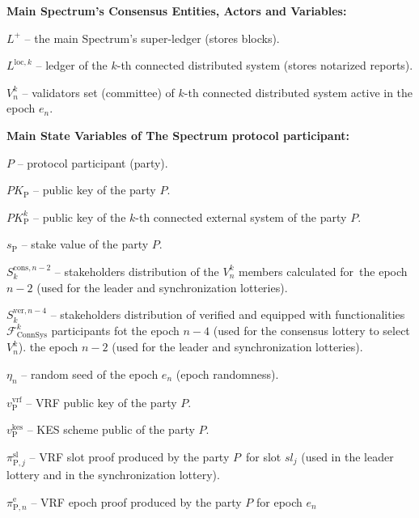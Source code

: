 \noindent
\textbf{Main Spectrum's Consensus Entities, Actors and Variables:}
\begin{legal}
    \item[\ding{113}] $L^+$ -- the main Spectrum's super-ledger (stores blocks).
    \item[\ding{113}] $L^{\text{loc}, k}$ -- ledger of the $k$-th connected distributed system (stores notarized reports).
    \item[\ding{113}] $V^k_n$ -- validators set (committee) of $k$-th connected distributed system active in the epoch $e_n$.
\end{legal}
\bigbreak

\noindent
\textbf{Main State Variables of The Spectrum protocol participant:}
\begin{legal}
    \item[\ding{113}] $P$ -- protocol participant (party).
    \item[\ding{113}] $PK_{\text{P}}$ -- public key of the party $P$.
    \item[\ding{113}] $PK^k_{\text{P}}$ -- public key of the $k$-th connected external system of the party $P$.
    \item[\ding{113}] $s_{\text{P}}$ -- stake value of the party $P$.
    \item[\ding{113}] $S_k^{\text{cons}, n - 2}$ -- stakeholders distribution of the $V^k_n$ members calculated for\
    the epoch $n - 2$ (used for the leader and synchronization lotteries).
    \item[\ding{113}] $S_k^{\text{ver}, n - 4}$ -- stakeholders distribution of verified and equipped with functionalities\
    $\mathcal{F}^k_{\text{ConnSys}}$ participants fot the epoch $n - 4$ (used for the consensus lottery to select $V^k_n$).
    the epoch $n - 2$ (used for the leader and synchronization lotteries).
    \item[\ding{113}] $\eta_n$ -- random seed of the epoch $e_n$ (epoch randomness).
    \item[\ding{113}] $v^{\text{vrf}}_{\text{P}}$ -- VRF public key of the party $P$.
    \item[\ding{113}] $v^{\text{kes}}_{\text{P}}$ -- KES scheme public of the party $P$.
    \item[\ding{113}] $\pi^{\text{sl}}_{\text{P}, j}$ -- VRF slot proof produced by the party $P$\
    for slot $sl_j$ (used in the leader lottery and in the synchronization lottery).
    \item[\ding{113}] $\pi^{\text{e}}_{\text{P}, n}$ -- VRF epoch proof produced by the party $P$ for epoch $e_n$\

\end{legal}
